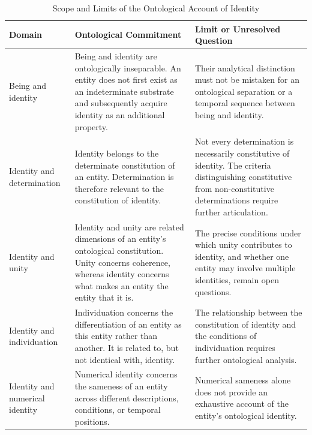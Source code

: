 
\begin{table}[htbp]
    \centering
    \caption{Scope and Limits of the Ontological Account of Identity}
    \label{tab:identity-scope-and-limits}

    \renewcommand{\arraystretch}{1.4}
    \begin{tabular}{p{3.3cm} p{5.0cm} p{5.3cm}}
        \hline
        \textbf{Domain} &
        \textbf{Ontological Commitment} &
        \textbf{Limit or Unresolved Question} \\
        \hline

        Being and identity &
        Being and identity are ontologically inseparable. An entity does not first exist as an indeterminate substrate and subsequently acquire identity as an additional property. &
        Their analytical distinction must not be mistaken for an ontological separation or a temporal sequence between being and identity. \\

        Identity and determination &
        Identity belongs to the determinate constitution of an entity. Determination is therefore relevant to the constitution of identity. &
        Not every determination is necessarily constitutive of identity. The criteria distinguishing constitutive from non-constitutive determinations require further articulation. \\

        Identity and unity &
        Identity and unity are related dimensions of an entity's ontological constitution. Unity concerns coherence, whereas identity concerns what makes an entity the entity that it is. &
        The precise conditions under which unity contributes to identity, and whether one entity may involve multiple identities, remain open questions. \\

        Identity and individuation &
        Individuation concerns the differentiation of an entity as this entity rather than another. It is related to, but not identical with, identity. &
        The relationship between the constitution of identity and the conditions of individuation requires further ontological analysis. \\

        Identity and numerical identity &
        Numerical identity concerns the sameness of an entity across different descriptions, conditions, or temporal positions. &
        Numerical sameness alone does not provide an exhaustive account of the entity's ontological identity. \\


\end{tabular}
\end{table}
